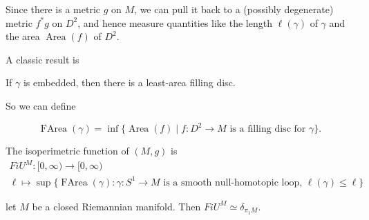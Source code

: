\documentclass[a4paper]{article}
\DeclareMathOperator\Area{Area}
\DeclareMathOperator\FArea{FArea}
\begin{document}
Since there is a metric $g$ on $M$, we can pull it back to a (possibly degenerate) metric $f^* g$ on $D^2$, and hence measure quantities like the length $\ell(\gamma)$ of $\gamma$ and the area $\Area(f)$ of $D^2$.

A classic result is
\begin{thm} %
  If $\gamma$ is embedded, then there is a least-area filling disc.
\end{thm}
So we can define
\begin{defi}[$\FArea$]\index{$\FArea$}
  \[
    \FArea(\gamma) = \inf \{\Area(f) \mid f: D^2 \to M\text{ is a filling disc for }\gamma\}.
  \]
\end{defi}

\begin{defi}
  The isoperimetric function of $(M, g)$ is
  \begin{multline*}
    FiU^M: [0, \infty) \to [0, \infty)\\
    \ell \mapsto \sup\{\FArea(\gamma): \gamma: S^1 \to M\text{ is a smooth null-homotopic loop, }\ell(\gamma) \leq \ell\}
  \end{multline*}
\end{defi}

\begin{thm}
  let $M$ be a closed Riemannian manifold. Then $FiU^M \simeq \delta_{\pi_1 M}$.
\end{thm}
\end{document}

